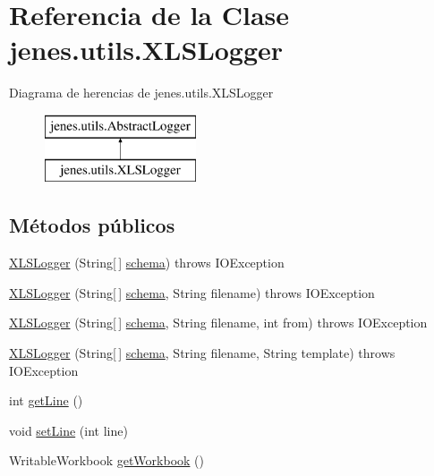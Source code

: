 \hypertarget{classjenes_1_1utils_1_1_x_l_s_logger}{\section{Referencia de la Clase jenes.\-utils.\-X\-L\-S\-Logger}
\label{classjenes_1_1utils_1_1_x_l_s_logger}
}
Diagrama de herencias de jenes.\-utils.\-X\-L\-S\-Logger\begin{figure}[H]
\begin{center}
\leavevmode
\includegraphics[height=2.000000cm]{classjenes_1_1utils_1_1_x_l_s_logger}
\end{center}
\end{figure}
\subsection*{Métodos públicos}
\begin{DoxyCompactItemize}
\item 
\hyperlink{classjenes_1_1utils_1_1_x_l_s_logger_a1fa625f6c332aca9178b1c7a4eb963d8}{X\-L\-S\-Logger} (String\mbox{[}$\,$\mbox{]} \hyperlink{classjenes_1_1utils_1_1_abstract_logger_a3a2030876857a0512fae7e0ad400c570}{schema})  throws I\-O\-Exception 
\item 
\hyperlink{classjenes_1_1utils_1_1_x_l_s_logger_a256b5ddf3beaa1eedb2290b52bb1a845}{X\-L\-S\-Logger} (String\mbox{[}$\,$\mbox{]} \hyperlink{classjenes_1_1utils_1_1_abstract_logger_a3a2030876857a0512fae7e0ad400c570}{schema}, String filename)  throws I\-O\-Exception 
\item 
\hyperlink{classjenes_1_1utils_1_1_x_l_s_logger_ac43b3385840e86a2ad4acd5040e8326b}{X\-L\-S\-Logger} (String\mbox{[}$\,$\mbox{]} \hyperlink{classjenes_1_1utils_1_1_abstract_logger_a3a2030876857a0512fae7e0ad400c570}{schema}, String filename, int from)  throws I\-O\-Exception 
\item 
\hyperlink{classjenes_1_1utils_1_1_x_l_s_logger_a2e438a48213dd4e1773c380d7f9d7e4b}{X\-L\-S\-Logger} (String\mbox{[}$\,$\mbox{]} \hyperlink{classjenes_1_1utils_1_1_abstract_logger_a3a2030876857a0512fae7e0ad400c570}{schema}, String filename, String template)  throws I\-O\-Exception 
\item 
int \hyperlink{classjenes_1_1utils_1_1_x_l_s_logger_a60e8ee28d3d3305e085726026e09cfdc}{get\-Line} ()
\item 
void \hyperlink{classjenes_1_1utils_1_1_x_l_s_logger_a2f9ce5372263fadce99a863149f3cb55}{set\-Line} (int line)
\item 
Writable\-Workbook \hyperlink{classjenes_1_1utils_1_1_x_l_s_logger_ab84e4c5e6518902f710cd3c3cc337f3d}{get\-Workbook} ()
\end{DoxyCompactItemize}
